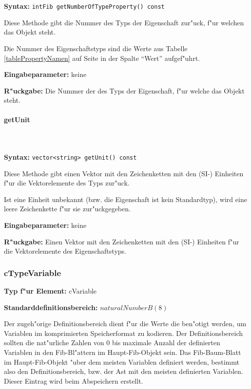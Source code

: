 \ \\\\\noindent
\textbf{Syntax:} \verb|intFib getNumberOfTypeProperty() const|

\bigskip\noindent
Diese Methode gibt die Nummer des Typs der Eigenschaft zur"uck, f"ur welchen das Objekt steht.

Die Nummer des Eigenschaftstyps sind die Werte aus Tabelle \ref{tablePropertyNamen} auf Seite \pageref{tablePropertyNamen} in der Spalte ``Wert'' aufgef"uhrt.

\bigskip\noindent
\textbf{Eingabeparameter:} keine

\bigskip\noindent
\textbf{R"uckgabe:} Die Nummer der des Typs der Eigenschaft, f"ur welche das Objekt steht.


\paragraph{getUnit}

\ \\\\\noindent
\textbf{Syntax:} \verb|vector<string> getUnit() const|

\bigskip\noindent
Diese Methode gibt einen Vektor mit den Zeichenketten mit den (SI-) Einheiten f"ur die Vektorelemente des Typs zur"uck.

Ist eine Einheit unbekannt (bzw. die Eigenschaft ist kein Standardtyp), wird eine leere Zeichenkette f"ur sie zur"uckgegeben.

\bigskip\noindent
\textbf{Eingabeparameter:} keine

\bigskip\noindent
\textbf{R"uckgabe:} Einen Vektor mit den Zeichenketten mit den (SI-) Einheiten f"ur die Vektorelemente des Eigenschaftstyps.



\subsubsection{cTypeVariable}

\textbf{Typ f"ur Element:} cVariable

\bigskip\noindent
\textbf{Standarddefinitionsbereich:} $naturalNumberB(8)$

Der zugeh"orige Definitionsbereich dient f"ur die Werte die ben"otigt werden, um Variablen im komprimierten Speicherformat zu kodieren. Der Definitionsbereich sollten die nat"urliche Zahlen von 0 bis maximale Anzahl der definierten Variablen in den Fib-Bl"attern im Haupt-Fib-Objekt sein. Das Fib-Baum-Blatt im Haupt-Fib-Objekt "uber dem meisten Variablen definiert werden, bestimmt also den Definitionsbereich, bzw. der Ast mit den meisten definierten Variablen. Dieser Eintrag wird beim Abspeichern erstellt.

